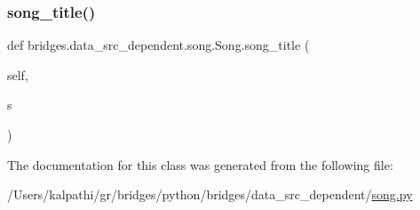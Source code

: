 \subsubsection{\texorpdfstring{song\_title()}{song\_title()}\hspace{0.1cm}{\footnotesize\ttfamily [2/2]}}
{\footnotesize\ttfamily def bridges.\+data\+\_\+src\+\_\+dependent.\+song.\+Song.\+song\+\_\+title (\begin{DoxyParamCaption}\item[{}]{self,  }\item[{}]{s }\end{DoxyParamCaption})}



The documentation for this class was generated from the following file\+:\begin{DoxyCompactItemize}
\item 
/\+Users/kalpathi/gr/bridges/python/bridges/data\+\_\+src\+\_\+dependent/\mbox{\hyperlink{song_8py}{song.\+py}}\end{DoxyCompactItemize}
